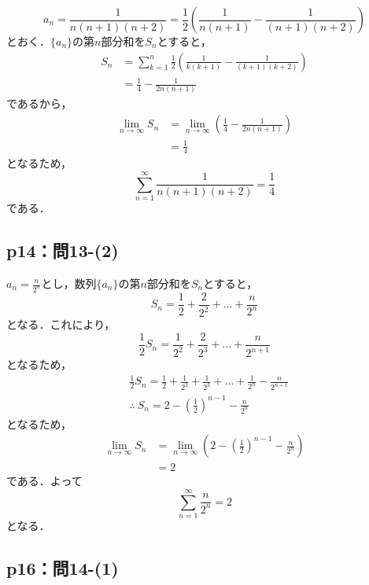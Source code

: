 \documentclass[uplatex,dvipdfmx,a4paper,10pt,fleqn]{jsarticle}
\begin{document}
\begin{tleftbar}
\[
   a_n = \frac{1}{n (n+1)(n+2)} = \frac{1}{2} \left ( \frac{1}{n(n+1)}- \frac{1}{(n+1)(n+2)} \right)
\]
とおく．$\{ a_n \}$の第$n$部分和を$S_n$とすると，
\begin{align*} 
    S_n & = \sum_{k=1}^{n}  \frac{1}{2} \left ( \frac{1}{k(k+1)}-\frac{1}{(k+1)(k+2)} \right) \\
    & = \frac{1}{4} - \frac{1}{2n(n+1)}
\end{align*} 
であるから，
\begin{align*}
    \lim_{n \to \infty} S_n &= \lim_{n \to \infty} \left (  \frac{1}{4} - \frac{1}{2n(n+1)} \right) \\
    &= \frac{1}{4}
\end{align*}
となるため，
\[
    \sum_{n=1}^{\infty} \frac{1}{n (n+1)(n+2)} = \frac{1}{4}
\]
である．
\end{tleftbar}


\subsection*{p14：問13-(2)}

\begin{tleftbar}
    $a_n = \frac{n}{2^n}$とし，数列$\{ a_n \}$の第$n$部分和を$S_n$とすると，
    \[
        S_n = \frac{1}{2}+ \frac{2}{2^2}+\dots + \frac{n}{2^n}
    \]
    となる．これにより，
    \[
        \frac{1}{2} S_n = \frac{1}{2^2}+\frac{2}{2^3}+\dots + \frac{n}{2^{n+1}}
    \]
    となるため，
    \begin{align*} 
        & \frac{1}{2} S_n = \frac{1}{2}+ \frac{1}{2^2}  +\frac{1}{2^3}+\dots +\frac{1}{2^n}-\frac{n}{2^{n+1}} \\
       & \therefore ~ S_n = 2- \left (\frac{1}{2} \right)^{n-1} -\frac{n}{2^n}
    \end{align*} 
    となるため，
    \begin{align*}
        \lim_{n \to \infty} S_n &= \lim_{n \to \infty}\left ( 2- \left (\frac{1}{2} \right)^{n-1} -\frac{n}{2^n} \right ) \\
        & = 2
    \end{align*}
    である．よって
    \[
        \sum_{n=1}^{\infty} \frac{n}{2^n}=2
    \]
    となる．
\end{tleftbar}


\subsection*{p16：問14-(1)}
\end{document}
